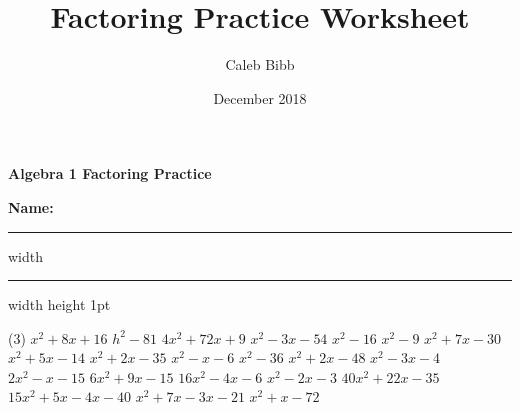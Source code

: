 \documentclass{article}
\title{Factoring Practice Worksheet}
\author{Caleb Bibb}
\date{December 2018}
\newcommand{\V}{\vspace{1in}}
\begin{document}
{\large\bfseries Algebra 1 \hfill  Factoring Practice}

\bigskip

{\bfseries Name: \underline{\hspace{3in}}}
\bigskip
\hrule width \hsize \kern 0.5mm \hrule width \hsize height 1pt
\begin{tasks}[style=enumerate](3)
\task $x^2 +8x +16$
\task $h^2 -81$
\task $4x^2 +72x +9$
\V
\task $x^2 -3x -54$
\task $x^2 -16$
\task $x^2 -9$
\V
\task $x^2 +7x -30$
\task $x^2 +5x -14$
\task $x^2 +2x -35$
\V
\task $x^2 -x -6$
\task $x^2 -36$
\task $x^2 +2x -48$
\V
\task $x^2 -3x -4$
\task $2x^2 -x -15$
\task $6x^2 +9x -15$
\V
\task $16x^2 -4x -6$
\task $x^2 -2x -3$
\task $40x^2 +22x - 35$
\V
\task $15x^2 +5x -4x -40$
\task $x^2 +7x -3x -21$
\task $x^2 +x -72$
\end{tasks}

\end{document}
